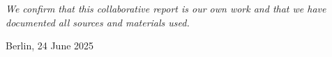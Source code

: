 \chapter*{}
\vspace{15cm}
\hfill\parbox{8cm}{
\raggedleft
\textit{We confirm that this collaborative report is our own work and that we have documented all sources and materials used.}\par 
\vspace{1em}
Berlin, 24 June 2025
}